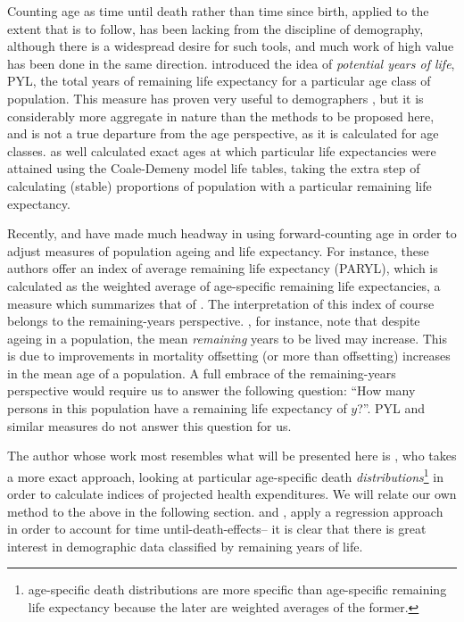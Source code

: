Counting age as time until death rather than time
since birth, applied to the extent that is to
follow, has been lacking from the discipline of demography, although there is a
widespread desire for such tools, and much work of high value has been done in
the same direction. \citet{hersch1944demographie}
introduced the idea of \textit{potential years of life}, PYL, the
total years of remaining life expectancy for a particular age class of
population. This measure has proven very useful to demographers
\citep{panush1996potential}, but it is considerably more aggregate in 
nature than the methods to be proposed
here, and is not a true departure from the age perspective, as it is calculated
for age classes. \citet{ryder1975notes} as well calculated exact ages at which
particular life expectancies were attained using the Coale-Demeny model
life tables, taking the extra step of calculating (stable) proportions
of population with a particular remaining life expectancy.

Recently, 
\citet{sanderson2005average,sanderson2010remeasuring} and have made much headway
 in using forward-counting age in order to adjust measures of population ageing and 
 life expectancy. For instance, these authors offer an index of average remaining 
 life expectancy (PARYL), which is calculated as the weighted average of age-specific 
 remaining life expectancies, a measure which summarizes that of
 \citet{hersch1944demographie}. The interpretation of this index of
 course belongs to the remaining-years perspective.
 \citet{sanderson2005average}, for instance, note that despite ageing 
 in a population, the mean \textit{remaining} years to 
 be lived may increase. This is due to improvements in mortality offsetting 
 (or more than offsetting) increases in the mean age of a population. A full 
 embrace of the remaining-years perspective would require us to answer
 the following question: ``How many persons in this population have a remaining
 life expectancy of $y$?''. PYL and similar measures do not answer this
 question for us.

The author whose work most resembles what will be
presented here is \citet{miller2001increasing}, who takes a more exact approach,
looking at particular age-specific death \textit{distributions}\footnote{age-specific death distributions are more
 specific than age-specific remaining life expectancy because the later are weighted 
 averages of the former.} in order to calculate indices
 of projected health expenditures. We will relate our own
 method to the above in the following section. \citet{stearns2004time} and
 \citet{seshamani2004longitudinal}, apply a regression approach in 
 order to account for time until-death-effects-- it is clear that there is great
 interest in demographic data classified by remaining years of life.
 
